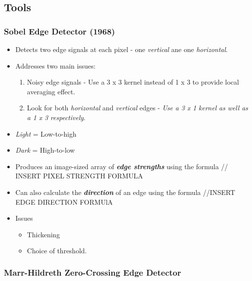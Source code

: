 \documentclass[english, 10pt]{article}
\begin{document}
\subsection{Tools}\label{tools}

\subsubsection{Sobel Edge Detector
(1968)}\label{sobel-edge-detector-1968}

\begin{itemize}
\itemsep1pt\parskip0pt
\item
  Detects two edge signals at each pixel - one \emph{vertical} ane one
  \emph{horizontal}.
\item
  Addresses two main issues:

  \begin{enumerate}
  \def\labelenumi{\arabic{enumi}.}
  \itemsep1pt\parskip0pt
  \item
    Noisy edge signals - Use a 3 x 3 kernel instead of 1 x 3 to provide local averaging effect.
  \item
    Look for both \emph{horizontal} and \emph{vertical} edges -
    \emph{Use a 3 x 1 kernel as well as a 1 x 3 respectively}.
  \end{enumerate}
\item
  \emph{Light} = Low-to-high
\item
  \emph{Dark} = High-to-low
\item
  Produces an image-sized array of \textbf{\emph{edge strengths}} using
  the formula // INSERT PIXEL STRENGTH FORMULA
\item
  Can also calculate the \textbf{\emph{direction}} of an edge using the
  formula //INSERT EDGE DIRECTION FORMUlA
\item
  Issues

  \begin{itemize}
  \itemsep1pt\parskip0pt
  \item
    Thickening
  \item
    Choice of threshold.
  \end{itemize}
\end{itemize}

\subsubsection{Marr-Hildreth Zero-Crossing Edge
Detector}\label{marr-hildreth-zero-crossing-edge-detector}
\end{document}
